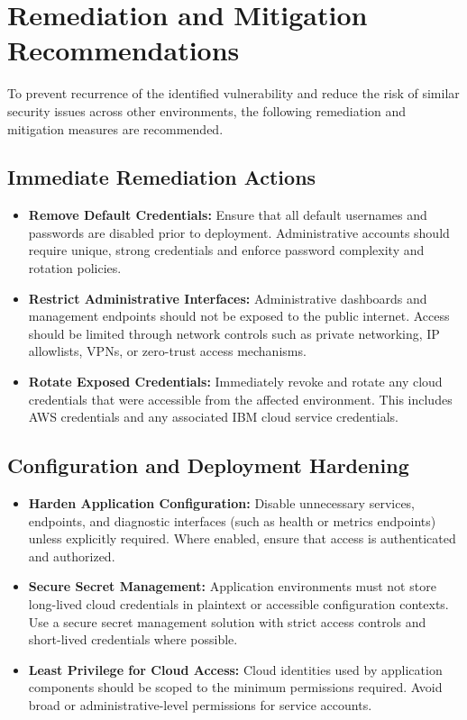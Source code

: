 \documentclass[12pt,a4paper]{report}
\begin{document}
\section{Remediation and Mitigation Recommendations}

To prevent recurrence of the identified vulnerability and reduce the risk of similar security issues across other environments, the following remediation and mitigation measures are recommended.

\subsection{Immediate Remediation Actions}

\begin{itemize}
	\item \textbf{Remove Default Credentials:} Ensure that all default usernames and passwords are disabled prior to deployment. Administrative accounts should require unique, strong credentials and enforce password complexity and rotation policies.

	\item \textbf{Restrict Administrative Interfaces:} Administrative dashboards and management endpoints should not be exposed to the public internet. Access should be limited through network controls such as private networking, IP allowlists, VPNs, or zero-trust access mechanisms.

	\item \textbf{Rotate Exposed Credentials:} Immediately revoke and rotate any cloud credentials that were accessible from the affected environment. This includes AWS credentials and any associated IBM cloud service credentials.
\end{itemize}

\subsection{Configuration and Deployment Hardening}

\begin{itemize}
	\item \textbf{Harden Application Configuration:} Disable unnecessary services, endpoints, and diagnostic interfaces (such as health or metrics endpoints) unless explicitly required. Where enabled, ensure that access is authenticated and authorized.

	\item \textbf{Secure Secret Management:} Application environments must not store long-lived cloud credentials in plaintext or accessible configuration contexts. Use a secure secret management solution with strict access controls and short-lived credentials where possible.

	\item \textbf{Least Privilege for Cloud Access:} Cloud identities used by application components should be scoped to the minimum permissions required. Avoid broad or administrative-level permissions for service accounts.
\end{itemize}
\end{document}
